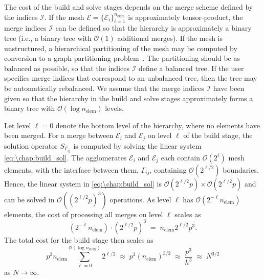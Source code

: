 The cost of the build and solve stages depends on the merge scheme defined by the indices $\mathcal{I}$. If the mesh $\mathcal{E} = \{\mathcal{E}_i\}_{i=1}^{n_\text{elem}}$ is approximately tensor-product, the merge indices $\mathcal{I}$ can be defined so that the hierarchy is approximately a binary tree (i.e., a binary tree with $\mathcal{O}(1)$ additional merges). If the mesh is unstructured, a hierarchical partitioning of the mesh may be computed by conversion to a graph partitioning problem~\cite{Karypis_98_01}. The partitioning should be as balanced as possible, so that the indices $\mathcal{I}$ define a balanced tree. If the user specifies merge indices that correspond to an unbalanced tree, then the tree may be automatically rebalanced. We assume that the merge indices $\mathcal{I}$ have been given so that the hierarchy in the build and solve stages approximately forms a binary tree with $\mathcal{O}(\log n_\text{elem})$ levels.

Let level $\ell = 0$ denote the bottom level of the hierarchy, where no elements have been merged. For a merge between $\mathcal{E}_i$ and $\mathcal{E}_j$ on level $\ell$ of the build stage, the solution operator $S_{\Gamma_{ij}}$ is computed by solving the linear system \cref{eq:\chap:build_sol}. The agglomerates $\mathcal{E}_i$ and $\mathcal{E}_j$ each contain $\mathcal{O}(2^\ell)$ mesh elements, with the interface between them, $\Gamma_{ij}$, containing $\mathcal{O}(2^{\ell/2})$ boundaries. Hence, the linear system in \cref{eq:\chap:build_sol} is $\mathcal{O}(2^{\ell/2} p) \times \mathcal{O}(2^{\ell/2} p)$ and can be solved in $\mathcal{O}((2^{\ell/2} p)^3)$ operations. As level $\ell$ has $\mathcal{O}(2^{-\ell} n_\text{elem})$ elements, the cost of processing all merges on level $\ell$ scales as
\[
\left(2^{-\ell} n_\text{elem}\right) \cdot \left(2^{\ell/2} p\right)^3 \;=\; n_\text{elem} 2^{\ell/2} p^3.
\]
The total cost for the build stage then scales as
\[
p^3 n_\text{elem} \!\!\!\!\!\! \sum_{\ell=0}^{\mathcal{O}(\log n_\text{elem})}\!\!\!\! 2^{\ell/2}
\;\approx\; p^3 (n_\text{elem})^{3/2}
\;\approx\; \frac{p^3}{h^3}
\;\approx\; N^{3/2}
\]
as $N \to \infty$.

